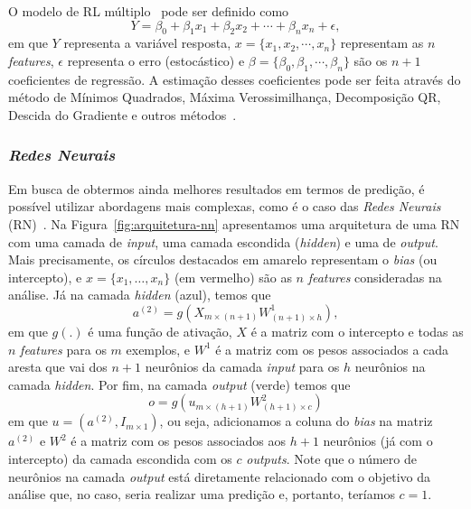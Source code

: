 \documentclass[runningheads,a4paper]{llncs}
\begin{document}
O modelo de RL múltiplo~\cite{Neter,Bishop} pode ser definido como
\begin{equation}
\label{eq:1}
Y=\beta_0 + \beta_1 x_1 + \beta_2 x_2 + \cdots + \beta_n x_n + \epsilon,
\end{equation}
em que $Y$ representa a variável resposta, $x=\{x_1,x_2,\cdots,x_n\}$ representam as $n$ \textit{features}, $\epsilon$ representa o erro (estocástico) e $\beta=\{\beta_0,\beta_1,\cdots,\beta_n\}$ são os $n+1$ coeficientes de regressão. A estimação desses coeficientes pode ser feita através do método de Mínimos Quadrados, Máxima Verossimilhança, Decomposição QR, Descida do Gradiente e outros métodos~\cite{Neter,Bishop}.

\subsubsection{\textit{Redes Neurais}}

Em busca de obtermos ainda melhores resultados em termos de predição, é possível utilizar abordagens mais complexas, como é o caso das \textit{Redes Neurais} (RN)~\cite{Neter,Bishop}. Na Figura~\ref{fig:arquitetura-nn} apresentamos uma arquitetura de uma RN com uma camada de \textit{input}, uma camada escondida (\textit{hidden}) e uma de \textit{output}. Mais precisamente, os círculos destacados em amarelo representam o \textit{bias} (ou intercepto), e $x=\{x_1,\dots,x_n\}$ (em vermelho) são as $n$ \textit{features} consideradas na análise. Já na camada \textit{hidden} (azul), temos que
\begin{equation}
\label{eq:3}
a^{(2)}=g(X_{m\times (n+1)}W^1_{(n+1)\times h}),
\end{equation}
em que $g(.)$ é uma função de ativação, $X$ é a matriz com o intercepto e todas as $n$ \textit{features} para os $m$ exemplos, e $W^1$ é a matriz com os pesos associados a cada aresta que vai dos $n+1$ neurônios da camada \textit{input} para os $h$ neurônios na camada \textit{hidden}. Por fim, na camada \textit{output} (verde) temos que
\begin{equation}
\label{eq:4}
o=g(u_{m\times (h+1)}W^2_{(h+1)\times c})
\end{equation}
em que $u = (a^{(2)}, I_{m\times1})$, ou seja, adicionamos a coluna do \textit{bias} na matriz $a^{(2)}$ e $W^2$ é a matriz com os pesos associados aos $h+1$ neurônios (já com o intercepto) da camada escondida com os $c$ \textit{outputs}. Note que o número de neurônios na camada \textit{output} está diretamente relacionado com o objetivo da análise que, no caso, seria realizar uma predição e, portanto, teríamos $c=1$.
\end{document}

